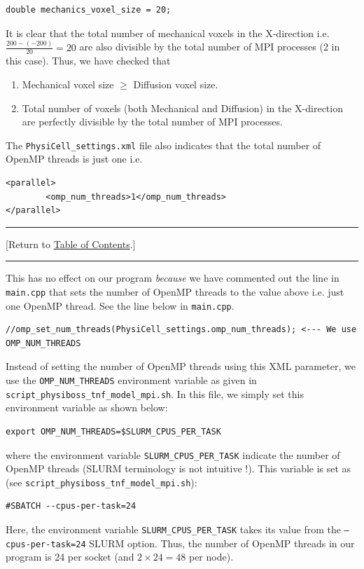 \documentclass[12pt]{article}
\newcommand{\TOClink}{\begin{center}\hrule\vskip-5pt\phantom{.}\hfill[Return to \hyperlink{TOC}{Table of Contents}.]\hfill\phantom{.}\vskip3pt\hrule\end{center}}
\begin{document}
\begin{verbatim}
double mechanics_voxel_size = 20;
\end{verbatim}
It is clear that the total number of mechanical voxels in the X-direction i.e. $\frac{200-(-200)}{20}=20$ are also divisible by the total number of MPI processes (2 in this case). Thus, we have checked that
\begin{enumerate}
    \item Mechanical voxel size $\geq$ Diffusion voxel size.
    \item Total number of voxels (both Mechanical and Diffusion) in the X-direction are perfectly divisible by the total number of MPI processes. 
\end{enumerate}
The \texttt{PhysiCell\_settings.xml} file also indicates that the total number of OpenMP threads is just one i.e.  
\begin{verbatim}
<parallel>
		<omp_num_threads>1</omp_num_threads>
</parallel>     
\end{verbatim}

\TOClink

This has no effect on our program \textit{because} we have commented out the line in \texttt{main.cpp} that sets the number of OpenMP threads to the value above i.e. just one OpenMP thread. See the line below in \texttt{main.cpp}.
\begin{verbatim}
//omp_set_num_threads(PhysiCell_settings.omp_num_threads); <--- We use OMP_NUM_THREADS
\end{verbatim}
Instead of setting the number of OpenMP threads using this XML parameter, we use the \texttt{OMP\_NUM\_THREADS} environment variable as given in \texttt{script\_physiboss\_tnf\_model\_mpi.sh}. In this file, we simply set this environment variable as shown below:
\begin{verbatim}
export OMP_NUM_THREADS=$SLURM_CPUS_PER_TASK
\end{verbatim}
where the environment variable \texttt{SLURM\_CPUS\_PER\_TASK} indicate the number of OpenMP threads (SLURM terminology is not intuitive !). This variable is set as (see \texttt{script\_physiboss\_tnf\_model\_mpi.sh}):
\begin{verbatim}
#SBATCH --cpus-per-task=24
\end{verbatim}
Here, the environment variable \texttt{SLURM\_CPUS\_PER\_TASK} takes its value from the \texttt{--cpus-per-task=24} SLURM option. Thus, the number of OpenMP threads in our program is 24 per socket (and $2 \times 24 = 48$ per node).\\
\end{document}
